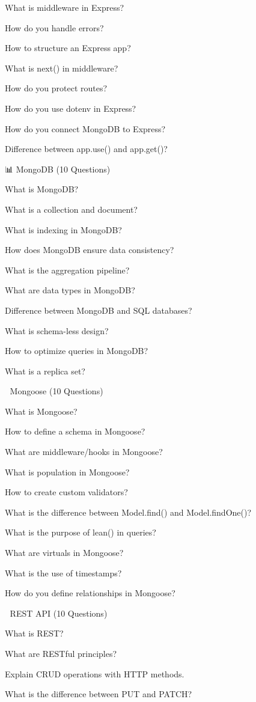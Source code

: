 What is middleware in Express?

How do you handle errors?

How to structure an Express app?

What is next() in middleware?

How do you protect routes?

How do you use dotenv in Express?

How do you connect MongoDB to Express?

Difference between app.use() and app.get()?

📊 MongoDB (10 Questions)

What is MongoDB?

What is a collection and document?

What is indexing in MongoDB?

How does MongoDB ensure data consistency?

What is the aggregation pipeline?

What are data types in MongoDB?

Difference between MongoDB and SQL databases?

What is schema-less design?

How to optimize queries in MongoDB?

What is a replica set?

🔹 Mongoose (10 Questions)

What is Mongoose?

How to define a schema in Mongoose?

What are middleware/hooks in Mongoose?

What is population in Mongoose?

How to create custom validators?

What is the difference between Model.find() and Model.findOne()?

What is the purpose of lean() in queries?

What are virtuals in Mongoose?

What is the use of timestamps?

How do you define relationships in Mongoose?

📁 REST API (10 Questions)

What is REST?

What are RESTful principles?

Explain CRUD operations with HTTP methods.

What is the difference between PUT and PATCH?

